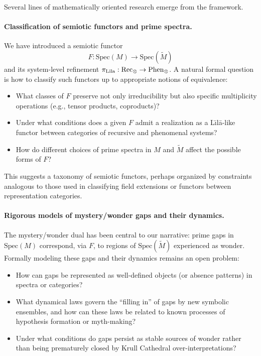 \documentclass[12]{amsart}
\theoremstyle{plain}
\begin{document}
Several lines of mathematically oriented research emerge from the framework.

\paragraph{Classification of semiotic functors and prime spectra.}

We have introduced a semiotic functor
\[
  F : \mathrm{Spec}(M) \longrightarrow \mathrm{Spec}(\tilde M)
\]
and its system-level refinement $\pi_{\text{L\={\i}la}} : \text{Rec}_\otimes \to \text{Phen}_\otimes$. A natural formal question is how to classify such functors up to appropriate notions of equivalence:

\begin{itemize}
  \item What classes of $F$ preserve not only irreducibility but also specific multiplicity operations (e.g., tensor products, coproducts)?
  \item Under what conditions does a given $F$ admit a realization as a L\={\i}lā-like functor between categories of recursive and phenomenal systems?
  \item How do different choices of prime spectra in $M$ and $\tilde M$ affect the possible forms of $F$?
\end{itemize}

This suggests a taxonomy of semiotic functors, perhaps organized by constraints analogous to those used in classifying field extensions or functors between representation categories.

\paragraph{Rigorous models of mystery/wonder gaps and their dynamics.}

The mystery/wonder dual has been central to our narrative: prime gaps in $\mathrm{Spec}(M)$ correspond, via $F$, to regions of $\mathrm{Spec}(\tilde M)$ experienced as wonder. Formally modeling these gaps and their dynamics remains an open problem:

\begin{itemize}
  \item How can gaps be represented as well-defined objects (or absence patterns) in spectra or categories?
  \item What dynamical laws govern the ``filling in'' of gaps by new symbolic ensembles, and how can these laws be related to known processes of hypothesis formation or myth-making?
  \item Under what conditions do gaps persist as stable sources of wonder rather than being prematurely closed by Krull Cathedral over-interpretations?
\end{itemize}
\end{document}
